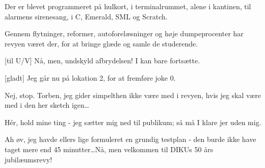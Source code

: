 \documentclass[a4paper,11pt]{article}
\begin{document}
\begin{sketch}
    Der er blevet programmeret på hulkort, i terminalrummet, alene i kantinen,
    til alarmens sirenesang, i C, Emerald, SML og Scratch.

    Gennem flytninger, reformer, autoforelæsninger og høje dumpeprocenter
    har revyen været der, for at bringe glæde og samle de studerende.


[til U/V] Nå, men, undskyld afbrydelsen! I kan bare fortsætte.


[gladt] Jeg går nu på lokation 2, for at fremføre joke 0.

 Nej, stop. Torben, jeg gider simpelthen ikke være med i revyen, hvis
jeg skal være med i den her sketch igen\ldots


 Hér, hold mine ting - jeg sætter mig ned til publikum; så må I klare jer
uden mig.


 Ah øv, jeg havde ellers lige formuleret en grundig testplan - den burde ikke have taget mere end 45 minutter\ldots Nå, men velkommen til DIKUs 50 års jubilæumsrevy!


\end{sketch}
\end{document}
